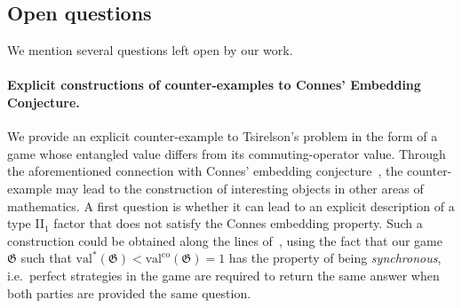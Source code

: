 \documentclass[11pt]{article}
\theoremstyle{definition}
\newcommand{\val}{\ensuremath{\mathrm{val}}}
\newcommand{\valco}{\ensuremath{\mathrm{val}^{\mathrm{co}}}}
\newcommand{\game}{\mathfrak{G}}
\newcommand{\class}[1]{\ensuremath{\mathsf{#1}}\xspace}
\newcommand{\NP}{\class{NP}} %
\newcommand{\NEXP}{\class{NEXP}} %
\newcommand{\QMA}{\class{QMA}} %
\newcommand{\QMIP}{\class{QMIP}} %
\newcommand{\MIP}{\class{MIP}} %
\newcommand{\NEEXP}{\class{NEEXP}} %
\begin{document}
%

\subsection{Open questions}
\label{sec:open}

We mention several questions left open by our work.

\paragraph{Explicit constructions of counter-examples to Connes' Embedding Conjecture.} We provide an explicit counter-example to Tsirelson's problem in the form of a game whose entangled value differs from its commuting-operator value. Through the aforementioned connection with Connes' embedding conjecture~\cite{fritz2012tsirelson,junge2011connes,ozawa2013connes}, the counter-example may lead to the construction of interesting objects in other areas of mathematics. A first question is whether it can lead to an explicit description of a type II$_1$ factor that does not satisfy the Connes embedding property. Such a construction could be obtained along the lines of~\cite{kim2018synchronous}, using the fact that our game $\game$ such that $\val^*(\game) < \valco(\game) = 1$ has the property of being \emph{synchronous}, i.e.\ perfect strategies in the game are required to return the same answer when both parties are provided the same question. 
\end{document}
